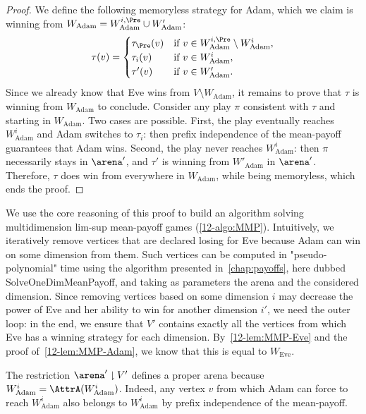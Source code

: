 \begin{proof}

We define the following memoryless strategy for Adam, which we claim is winning from $W_{\text{Adam}} = W^{i, \Pre}_{\text{Adam}} \cup W'_{\text{Adam}}$:
\[
\tau(v) =
\begin{cases}
\tau_\Pre(v) &\text{if } v \in W^{i, \Pre}_{\text{Adam}} \setminus W^{i}_{\text{Adam}},\\
\tau_i(v) &\text{if } v \in W^{i}_{\text{Adam}},\\
\tau'(v) &\text{if } v \in W'_{\text{Adam}}.
\end{cases}
\]
Since we already know that Eve wins from $V \setminus W_{\text{Adam}}$, it remains to prove that $\tau$ is winning from $W_{\text{Adam}}$ to conclude. Consider any play $\pi$ consistent with $\tau$ and starting in $W_{\text{Adam}}$. Two cases are possible. First, the play eventually reaches $W^{i}_{\text{Adam}}$ and Adam switches to $\tau_i$: then prefix independence of the mean-payoff guarantees that Adam wins. Second, the play never reaches $W^{i}_{\text{Adam}}$: then $\pi$ necessarily stays in $\arena'$, and $\tau'$ is winning from $W'_{\text{Adam}}$ in $\arena'$. Therefore, $\tau$ does win from everywhere in $W_{\text{Adam}}$, while being memoryless, which ends the proof.
\end{proof}

We use the core reasoning of this proof to build an algorithm solving multidimension lim-sup mean-payoff games (\cref{12-algo:MMP}). Intuitively, we iteratively remove vertices that are declared losing for Eve because Adam can win on some dimension from them. Such vertices can be computed in "pseudo-polynomial" time using the algorithm presented in~\cref{chap:payoffs},  here dubbed \textsf{SolveOneDimMeanPayoff}, and taking as parameters the arena and the considered dimension. Since removing vertices based on some dimension $i$ may decrease the power of Eve and her ability to win for another dimension $i'$, we need the outer loop: in the end, we ensure that $V'$ contains exactly all the vertices from which Eve has a winning strategy for each dimension. By~\cref{12-lem:MMP-Eve} and the proof of~\cref{12-lem:MMP-Adam}, we know that this is equal to $W_{\text{Eve}}$.

\begin{remark}
\label{12-rmk:properArena}
The restriction $\arena' \downharpoonright V'$ defines a proper arena because $W^i_{\text{Adam}} = \AttrA(W^i_{\text{Adam}})$. Indeed, any vertex $v$ from which Adam can force to reach $W^i_{\text{Adam}}$ also belongs to $W^i_{\text{Adam}}$ by prefix independence of the mean-payoff.
\end{remark}

